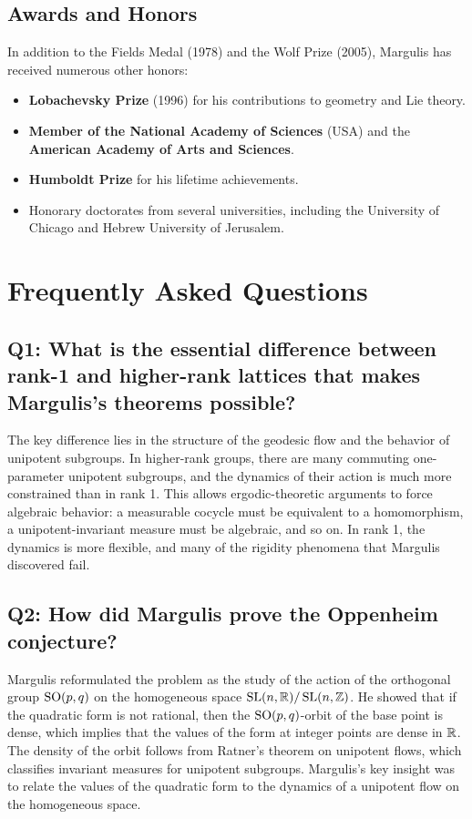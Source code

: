 \subsection{Awards and Honors}

In addition to the Fields Medal (1978) and the Wolf Prize (2005), Margulis has received numerous other honors:
\begin{itemize}
    \item \textbf{Lobachevsky Prize} (1996) for his contributions to geometry and Lie theory.
    \item \textbf{Member of the National Academy of Sciences} (USA) and the \textbf{American Academy of Arts and Sciences}.
    \item \textbf{Humboldt Prize} for his lifetime achievements.
    \item Honorary doctorates from several universities, including the University of Chicago and Hebrew University of Jerusalem.
\end{itemize}

\section{Frequently Asked Questions}

\subsection*{Q1: What is the essential difference between rank-1 and higher-rank lattices that makes Margulis's theorems possible?}

The key difference lies in the structure of the geodesic flow and the behavior of unipotent subgroups. In higher-rank groups, there are many commuting one-parameter unipotent subgroups, and the dynamics of their action is much more constrained than in rank 1. This allows ergodic-theoretic arguments to force algebraic behavior: a measurable cocycle must be equivalent to a homomorphism, a unipotent-invariant measure must be algebraic, and so on. In rank 1, the dynamics is more flexible, and many of the rigidity phenomena that Margulis discovered fail.

\subsection*{Q2: How did Margulis prove the Oppenheim conjecture?}

Margulis reformulated the problem as the study of the action of the orthogonal group \(\operatorname{SO}(p,q)\) on the homogeneous space \(\operatorname{SL}(n,\mathbb{R})/\operatorname{SL}(n,\mathbb{Z})\). He showed that if the quadratic form is not rational, then the \(\operatorname{SO}(p,q)\)-orbit of the base point is dense, which implies that the values of the form at integer points are dense in \(\mathbb{R}\). The density of the orbit follows from Ratner's theorem on unipotent flows, which classifies invariant measures for unipotent subgroups. Margulis's key insight was to relate the values of the quadratic form to the dynamics of a unipotent flow on the homogeneous space.

